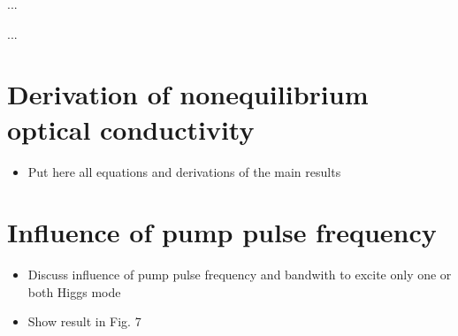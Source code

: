 \documentclass[aps,prb,reprint,noeprint,superscriptaddress]{revtex4-2}
\begin{document}
...







\begin{acknowledgments}
...
\end{acknowledgments}











\appendix


\section{Derivation of nonequilibrium optical conductivity}
\label{sec:derivation_noneq_cond}


\begin{itemize}
	\item Put here all equations and derivations of the main results
\end{itemize}






\section{Influence of pump pulse frequency}
\label{sec:influence_pump_pulse_freq}

\begin{itemize}
	\item Discuss influence of pump pulse frequency and bandwith to excite only one or both Higgs mode
	\item Show result in Fig. 7
\end{itemize}
\end{document}
